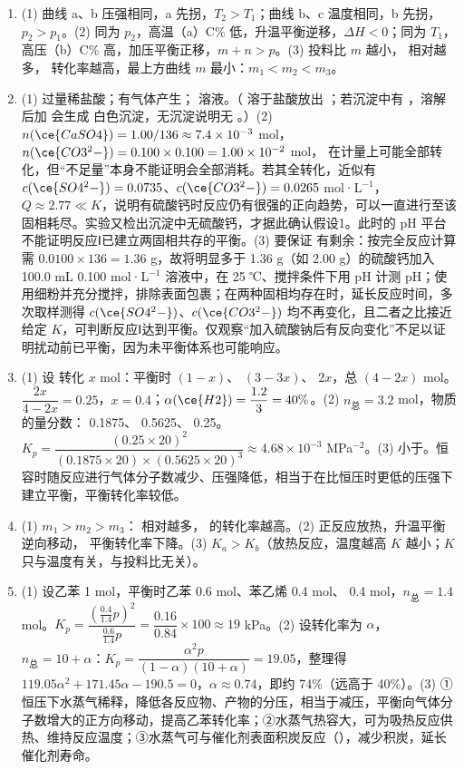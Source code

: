 \documentclass[UTF8,a4paper,zihao=5,oneside,openany,fontset=none]{ctexbook}
\newenvironment{jiexilist}{\small\begin{enumerate}[label={\textbf{\arabic*}.},leftmargin=1.6em,itemsep=0.3em,topsep=0.2em]}{\end{enumerate}}
\begin{document}
\begin{jiexilist}
\item (1) 曲线 a、b 压强相同，a 先拐，$T_2>T_1$；曲线 b、c 温度相同，b 先拐，$p_2>p_1$。(2) 同为 $p_2$，高温（a）C\% 低，升温平衡逆移，$\Delta H<0$；同为 $T_1$，高压（b）C\% 高，加压平衡正移，$m+n>p$。(3) 投料比 $m$ 越小， 相对越多， 转化率越高，最上方曲线 $m$ 最小：$m_1<m_2<m_3$。
\item (1) 过量稀盐酸；有气体产生； 溶液。（ 溶于盐酸放出 ；若沉淀中有 ，溶解后加  会生成  白色沉淀，无沉淀说明无 。）(2) $n(\ce{CaSO4})=1.00/136\approx7.4\times10^{-3}$ mol，$n(\ce{CO3^2-})=0.100\times0.100=1.00\times10^{-2}$ mol， 在计量上可能全部转化，但“不足量”本身不能证明会全部消耗。若其全转化，近似有 $c(\ce{SO4^2-})=0.0735$、$c(\ce{CO3^2-})=0.0265$ mol·L$^{-1}$，$Q\approx2.77\ll K$，说明有硫酸钙时反应仍有很强的正向趋势，可以一直进行至该固相耗尽。实验又检出沉淀中无硫酸钙，才据此确认假设1。此时的 pH 平台不能证明反应Ⅰ已建立两固相共存的平衡。(3) 要保证  有剩余：按完全反应计算需 $0.0100\times136=1.36$ g，故将明显多于 1.36 g（如 2.00 g）的硫酸钙加入 100.0 mL 0.100 mol·L$^{-1}$  溶液中，在 25 ℃、搅拌条件下用 pH 计测 pH；使用细粉并充分搅拌，排除表面包裹；在两种固相均存在时，延长反应时间，多次取样测得 $c(\ce{SO4^2-})$、$c(\ce{CO3^2-})$ 均不再变化，且二者之比接近给定 $K$，可判断反应Ⅰ达到平衡。仅观察“加入硫酸钠后有反向变化”不足以证明扰动前已平衡，因为未平衡体系也可能响应。
\item (1) 设  转化 $x$ mol：平衡时  $(1-x)$、 $(3-3x)$、 $2x$，总 $(4-2x)$ mol。$\dfrac{2x}{4-2x}=0.25$，$x=0.4$；$\alpha(\ce{H2})=\dfrac{1.2}{3}=40\%$。(2) $n_\text{总}=3.2$ mol，物质的量分数： 0.1875、 0.5625、 0.25。$K_p=\dfrac{(0.25\times20)^2}{(0.1875\times20)\times(0.5625\times20)^3}\approx4.68\times10^{-3}$ MPa$^{-2}$。(3) 小于。恒容时随反应进行气体分子数减少、压强降低，相当于在比恒压时更低的压强下建立平衡，平衡转化率较低。
\item (1) $m_1>m_2>m_3$： 相对越多， 的转化率越高。(2) 正反应放热，升温平衡逆向移动， 平衡转化率下降。(3) $K_a>K_b$（放热反应，温度越高 $K$ 越小；$K$ 只与温度有关，与投料比无关）。
\item (1) 设乙苯 1 mol，平衡时乙苯 0.6 mol、苯乙烯 0.4 mol、 0.4 mol，$n_\text{总}=1.4$ mol。$K_p=\dfrac{(\frac{0.4}{1.4}p)^2}{\frac{0.6}{1.4}p}=\dfrac{0.16}{0.84}\times100\approx19$ kPa。(2) 设转化率为 $\alpha$，$n_\text{总}=10+\alpha$：$K_p=\dfrac{\alpha^2p}{(1-\alpha)(10+\alpha)}=19.05$，整理得 $119.05\alpha^2+171.45\alpha-190.5=0$，$\alpha\approx0.74$，即约 74\%（远高于 40\%）。(3) ①恒压下水蒸气稀释，降低各反应物、产物的分压，相当于减压，平衡向气体分子数增大的正方向移动，提高乙苯转化率；②水蒸气热容大，可为吸热反应供热、维持反应温度；③水蒸气可与催化剂表面积炭反应（），减少积炭，延长催化剂寿命。

\end{jiexilist}
\end{document}
